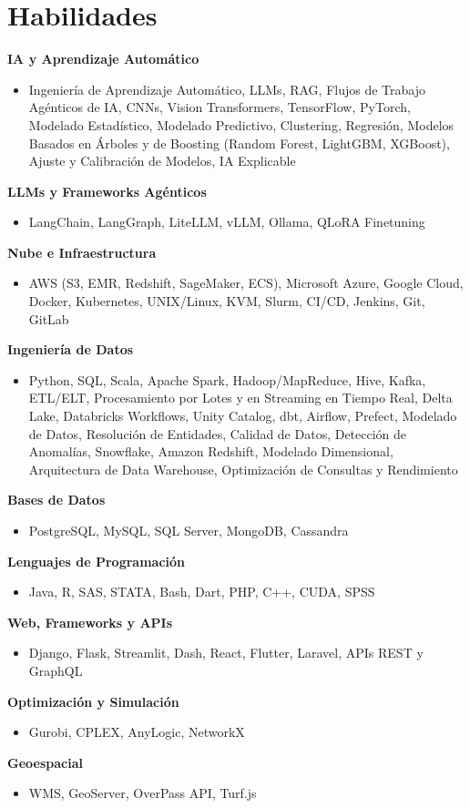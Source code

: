 \documentclass[10pt,letterpaper]{article}
\newcommand{\cat}[1]{\vspace{2pt}\noindent\textbf{#1}\par\vspace{-1pt}}
\begin{document}
\section{Habilidades}
\cat{IA y Aprendizaje Automático}
\begin{itemize}\item Ingeniería de Aprendizaje Automático, LLMs, RAG, Flujos de Trabajo Agénticos de IA, CNNs, Vision Transformers, TensorFlow, PyTorch, Modelado Estadístico, Modelado Predictivo, Clustering, Regresión, Modelos Basados en Árboles y de Boosting (Random Forest, LightGBM, XGBoost), Ajuste y Calibración de Modelos, IA Explicable\end{itemize}
\cat{LLMs y Frameworks Agénticos}
\begin{itemize}\item LangChain, LangGraph, LiteLLM, vLLM, Ollama, QLoRA Finetuning\end{itemize}
\cat{Nube e Infraestructura}
\begin{itemize}\item AWS (S3, EMR, Redshift, SageMaker, ECS), Microsoft Azure, Google Cloud, Docker, Kubernetes, UNIX/Linux, KVM, Slurm, CI/CD, Jenkins, Git, GitLab\end{itemize}
\cat{Ingeniería de Datos}
\begin{itemize}\item Python, SQL, Scala, Apache Spark, Hadoop/MapReduce, Hive, Kafka, ETL/ELT, Procesamiento por Lotes y en Streaming en Tiempo Real, Delta Lake, Databricks Workflows, Unity Catalog, dbt, Airflow, Prefect, Modelado de Datos, Resolución de Entidades, Calidad de Datos, Detección de Anomalías, Snowflake, Amazon Redshift, Modelado Dimensional, Arquitectura de Data Warehouse, Optimización de Consultas y Rendimiento\end{itemize}
\cat{Bases de Datos}
\begin{itemize}\item PostgreSQL, MySQL, SQL Server, MongoDB, Cassandra\end{itemize}
\cat{Lenguajes de Programación}
\begin{itemize}\item Java, R, SAS, STATA, Bash, Dart, PHP, C++, CUDA, SPSS\end{itemize}
\cat{Web, Frameworks y APIs}
\begin{itemize}\item Django, Flask, Streamlit, Dash, React, Flutter, Laravel, APIs REST y GraphQL\end{itemize}
\cat{Optimización y Simulación}
\begin{itemize}\item Gurobi, CPLEX, AnyLogic, NetworkX\end{itemize}
\cat{Geoespacial}
\begin{itemize}\item WMS, GeoServer, OverPass API, Turf.js\end{itemize}
\end{document}
